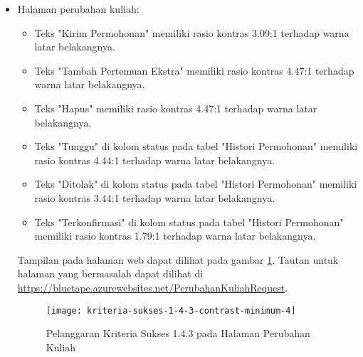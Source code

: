 \begin{itemize}
    \item Halaman perubahan kuliah: 
    \begin{itemize}
        \item Teks "Kirim Permohonan" memiliki rasio kontras 3.09:1 terhadap warna latar belakangnya.
        \item Teks "Tambah Pertemuan Ekstra" memiliki rasio kontras 4.47:1 terhadap warna latar belakangnya.
        \item Teks "Hapus" memiliki rasio kontras 4.47:1 terhadap warna latar belakangnya.
        \item Teks "Tunggu" di kolom status pada tabel "Histori Permohonan" memiliki rasio kontras 4.44:1 terhadap warna latar belakangnya.
        \item Teks "Ditolak" di kolom status pada tabel "Histori Permohonan" memiliki rasio kontras 3.44:1 terhadap warna latar belakangnya.
        \item Teks "Terkonfirmasi" di kolom status pada tabel "Histori Permohonan" memiliki rasio kontras 1.79:1 terhadap warna latar belakangnya.
    \end{itemize}
    Tampilan pada halaman web dapat dilihat pada gambar \ref{fig:1.4.3_contrast_minimum_4}. Tautan untuk halaman yang bermasalah dapat dilihat di \url{https://bluetape.azurewebsites.net/PerubahanKuliahRequest}.
    \begin{figure}[H]
        \centering  
        \texttt{[image: kriteria-sukses-1-4-3-contrast-minimum-4]}  
        \caption[Pelanggaran Kriteria Sukses 1.4.3 pada Halaman Perubahan Kuliah]{Pelanggaran Kriteria Sukses 1.4.3 pada Halaman Perubahan Kuliah}
        \label{fig:1.4.3_contrast_minimum_4}  
    \end{figure} 
    

\end{itemize}
